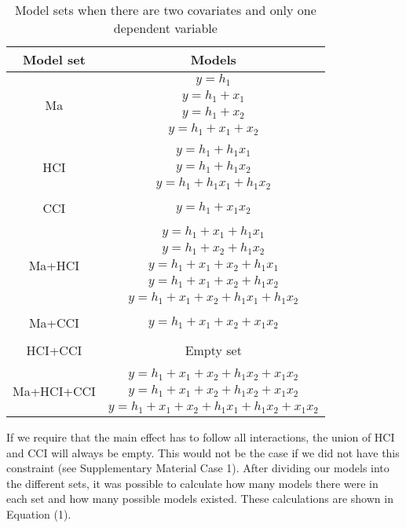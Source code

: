 \begin{table}[]
\caption{}
\caption*{\footnotesize Model sets when there are two covariates and only one dependent variable}
\centering
\begin{tabular}{cc}
\toprule
Model set & Models \\ 
\midrule
\multirow{4}{*}{Ma} & $y=h_1$ \\ & $y=h_1+x_1$ \\ & $y=h_1+x_2$ \\ & $y=h_1+x_1+x_2$  \\ & \\
\multirow{3}{*}{HCI} & $y=h_1+h_1x_1$ \\ & $y=h_1+h_1x_2$ \\ & $y=h_1+h_1x_1+h_1x_2$  \\& \\
CCI & $y=h_1+x_1x_2$ \\ & \\
\multirow{5}{*}{Ma+HCI} & $y=h_1+x_1+h_1x_1$  \\ & $y=h_1+x_2+h_1x_2$  \\& $y=h_1+x_1+x_2+h_1x_1$  \\& $y=h_1+x_1+x_2+h_1x_2$  \\& $y=h_1+x_1+x_2+h_1x_1+h_1x_2$ \\ & \\
Ma+CCI & $y=h_1+x_1+x_2+x_1x_2$ \\ & \\
HCI+CCI & Empty set \\ & \\
\multirow{3}{*}{Ma+HCI+CCI} & $y=h_1+x_1+x_2+h_1x_2+x_1x_2$ \\ & $y=h_1+x_1+x_2+h_1x_2+x_1x_2$ \\ & $y=h_1+x_1+x_2+h_1x_1+h_1x_2+x_1x_2$ \\
\bottomrule
\end{tabular}
\end{table}


If we require that the main effect has to follow all interactions, the union of HCI and CCI will always be empty. This would not be the case if we did not have this constraint (see Supplementary Material Case 1). After dividing our models into the different sets, it was possible to calculate how many models there were in each set and how many possible models existed. These calculations are shown in Equation (1). \\

